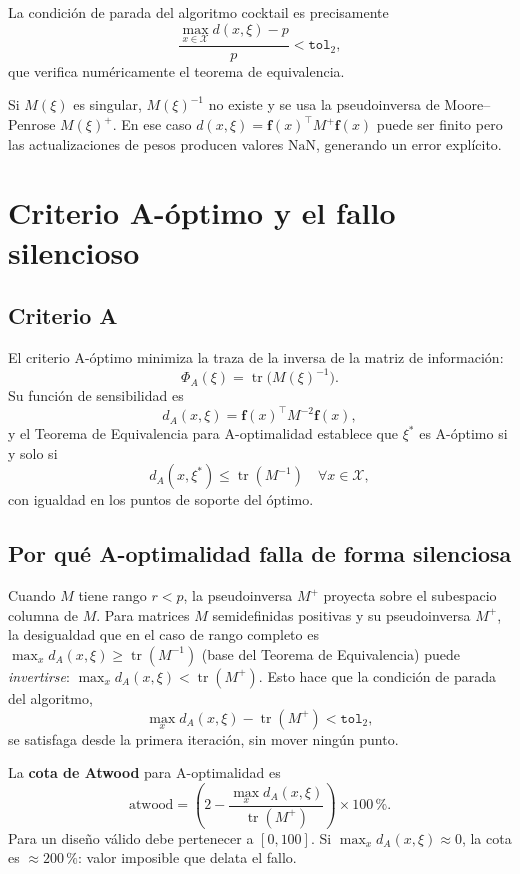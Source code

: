 \documentclass[11pt, a4paper]{article}
\DeclareMathOperator{\tr}{tr}
\newcommand{\ff}{\mathbf{f}}
\begin{document}
La condici\'on de parada del algoritmo cocktail es precisamente
\[
  \frac{\max_{x \in \mathcal{X}} d(x,\xi) - p}{p} < \texttt{tol}_2,
\]
que verifica num\'ericamente el teorema de equivalencia.

Si $M(\xi)$ es singular, $M(\xi)^{-1}$ no existe y se usa la pseudoinversa de
Moore--Penrose $M(\xi)^+$.  En ese caso $d(x,\xi) = \ff(x)^\top M^+ \ff(x)$ puede ser
finito pero las actualizaciones de pesos producen valores $\mathrm{NaN}$, generando un
error expl\'icito.

\section{Criterio A-\'optimo y el fallo silencioso}

\subsection{Criterio A}

El criterio A-\'optimo minimiza la traza de la inversa de la matriz de informaci\'on:
\[
  \Phi_A(\xi) = \tr\bigl(M(\xi)^{-1}\bigr).
\]
Su funci\'on de sensibilidad es
\[
  d_A(x,\xi) = \ff(x)^\top M^{-2} \ff(x),
\]
y el Teorema de Equivalencia para A-optimalidad establece que $\xi^*$ es A-\'optimo si y
solo si
\[
  d_A(x,\xi^*) \leq \tr(M^{-1}) \quad \forall x \in \mathcal{X},
\]
con igualdad en los puntos de soporte del \'optimo.

\subsection{Por qu\'e A-optimalidad falla de forma silenciosa}

Cuando $M$ tiene rango $r < p$, la pseudoinversa $M^+$ proyecta sobre el subespacio columna
de $M$.  Para matrices $M$ semidefinidas positivas y su pseudoinversa $M^+$, la desigualdad
que en el caso de rango completo es $\max_x d_A(x,\xi) \geq \tr(M^{-1})$ (base del Teorema
de Equivalencia) puede \emph{invertirse}: $\max_x d_A(x,\xi) < \tr(M^+)$.  Esto hace que
la condici\'on de parada del algoritmo,
\[
  \max_x d_A(x,\xi) - \tr(M^+) < \texttt{tol}_2,
\]
se satisfaga desde la primera iteraci\'on, sin mover ning\'un punto.

La \textbf{cota de Atwood} para A-optimalidad es
\[
  \text{atwood}
  = \left(2 - \frac{\max_x d_A(x,\xi)}{\tr(M^+)}\right) \times 100\,\%.
\]
Para un dise\~no v\'alido debe pertenecer a $[0, 100]$.  Si $\max_x d_A(x,\xi) \approx 0$,
la cota es $\approx 200\,\%$: valor imposible que delata el fallo.
\end{document}
